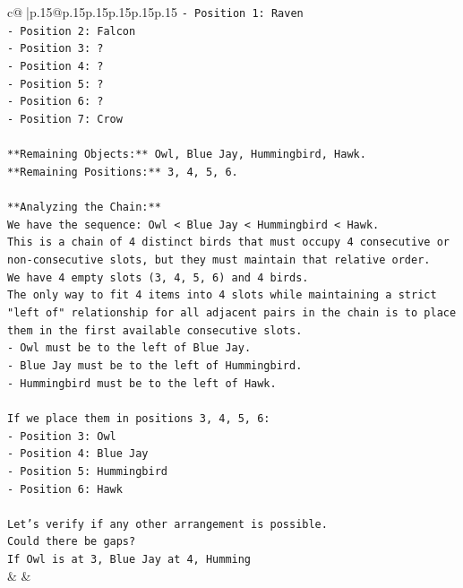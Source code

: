 \documentclass{article}
\begin{document}
{\begin{supertabular}{c@{$\;$}|p{.15\linewidth}@{}p{.15\linewidth}p{.15\linewidth}p{.15\linewidth}p{.15\linewidth}p{.15\linewidth}}
{{{\texttt{{-} Position 1: Raven} \\
\texttt{{-} Position 2: Falcon} \\
\texttt{{-} Position 3: ?} \\
\texttt{{-} Position 4: ?} \\
\texttt{{-} Position 5: ?} \\
\texttt{{-} Position 6: ?} \\
\texttt{{-} Position 7: Crow} \\
\\ 
\texttt{**Remaining Objects:** Owl, Blue Jay, Hummingbird, Hawk.} \\
\texttt{**Remaining Positions:** 3, 4, 5, 6.} \\
\\ 
\texttt{**Analyzing the Chain:**} \\
\texttt{We have the sequence: Owl < Blue Jay < Hummingbird < Hawk.} \\
\texttt{This is a chain of 4 distinct birds that must occupy 4 consecutive or non{-}consecutive slots, but they must maintain that relative order.} \\
\texttt{We have 4 empty slots (3, 4, 5, 6) and 4 birds.} \\
\texttt{The only way to fit 4 items into 4 slots while maintaining a strict "left of" relationship for all adjacent pairs in the chain is to place them in the first available consecutive slots.} \\
\texttt{{-} Owl must be to the left of Blue Jay.} \\
\texttt{{-} Blue Jay must be to the left of Hummingbird.} \\
\texttt{{-} Hummingbird must be to the left of Hawk.} \\
\\ 
\texttt{If we place them in positions 3, 4, 5, 6:} \\
\texttt{{-} Position 3: Owl} \\
\texttt{{-} Position 4: Blue Jay} \\
\texttt{{-} Position 5: Hummingbird} \\
\texttt{{-} Position 6: Hawk} \\
\\ 
\texttt{Let's verify if any other arrangement is possible.} \\
\texttt{Could there be gaps?} \\
\texttt{If Owl is at 3, Blue Jay at 4, Humming} \\
            }
        }
    }
    & & \\ \\


\end{supertabular}}
\end{document}

